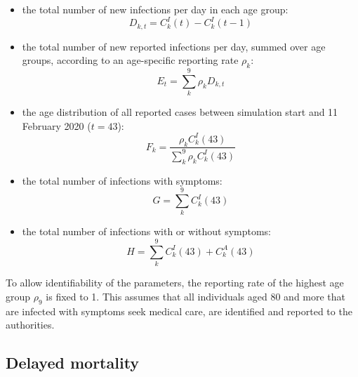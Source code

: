 \documentclass{article}
\begin{document}
	\begin{itemize}
		\item the total number of new infections per day in each age group:
		\begin{equation}
		D_{k,t} =  C^I_k(t) - C^I_k(t-1) 
		\end{equation}
		\item  the total number of new reported infections per day, summed over age groups, according to an age-specific reporting rate $\rho_k$:
		\begin{equation}
		E_t = \sum_k^9 \rho_k D_{k,t}
		\end{equation}	
		\item the age distribution of all reported cases between simulation start and 11 February 2020 ($t=43$):
		\begin{equation}
		F_k =  \frac{\rho_kC^I_k(43)}{\sum_k^9 \rho_k C^I_k(43)}
		\end{equation}	
		\item the total number of infections with symptoms:
		\begin{equation}
		G = \sum_k^9 C^I_k(43)
		\end{equation}	
		\item the total number of infections with or without symptoms:
		\begin{equation}
		H = \sum_k^9 C^I_k(43) + C^A_k(43)
		\end{equation}
	\end{itemize}
	To allow identifiability of the parameters, the reporting rate of the highest age group $\rho_9$ is fixed to 1. 
	This assumes that all individuals aged 80 and more that are infected with symptoms seek medical care, are identified and reported to the authorities. 
	
	\subsection{Delayed mortality}
	
\end{document}
